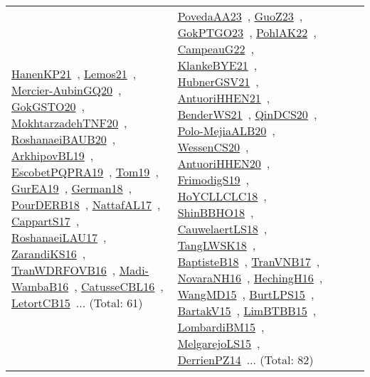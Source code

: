 {\begin{longtable}{lp{3cm}>{\raggedright\arraybackslash}p{6cm}>{\raggedright\arraybackslash}p{6cm}>{\raggedright\arraybackslash}p{8cm}}
\href{../works/HanenKP21.pdf}{HanenKP21}~\cite{HanenKP21}, \href{../works/Lemos21.pdf}{Lemos21}~\cite{Lemos21}, \href{../works/Mercier-AubinGQ20.pdf}{Mercier-AubinGQ20}~\cite{Mercier-AubinGQ20}, \href{../works/GokGSTO20.pdf}{GokGSTO20}~\cite{GokGSTO20}, \href{../works/MokhtarzadehTNF20.pdf}{MokhtarzadehTNF20}~\cite{MokhtarzadehTNF20}, \href{../works/RoshanaeiBAUB20.pdf}{RoshanaeiBAUB20}~\cite{RoshanaeiBAUB20}, \href{../works/ArkhipovBL19.pdf}{ArkhipovBL19}~\cite{ArkhipovBL19}, \href{../works/EscobetPQPRA19.pdf}{EscobetPQPRA19}~\cite{EscobetPQPRA19}, \href{../works/Tom19.pdf}{Tom19}~\cite{Tom19}, \href{../works/GurEA19.pdf}{GurEA19}~\cite{GurEA19}, \href{../works/German18.pdf}{German18}~\cite{German18}, \href{../works/PourDERB18.pdf}{PourDERB18}~\cite{PourDERB18}, \href{../works/NattafAL17.pdf}{NattafAL17}~\cite{NattafAL17}, \href{../works/CappartS17.pdf}{CappartS17}~\cite{CappartS17}, \href{../works/RoshanaeiLAU17.pdf}{RoshanaeiLAU17}~\cite{RoshanaeiLAU17}, \href{../works/ZarandiKS16.pdf}{ZarandiKS16}~\cite{ZarandiKS16}, \href{../works/TranWDRFOVB16.pdf}{TranWDRFOVB16}~\cite{TranWDRFOVB16}, \href{../works/Madi-WambaB16.pdf}{Madi-WambaB16}~\cite{Madi-WambaB16}, \href{../works/CatusseCBL16.pdf}{CatusseCBL16}~\cite{CatusseCBL16}, \href{../works/LetortCB15.pdf}{LetortCB15}~\cite{LetortCB15}... (Total: 61) & \href{../works/PovedaAA23.pdf}{PovedaAA23}~\cite{PovedaAA23}, \href{../works/GuoZ23.pdf}{GuoZ23}~\cite{GuoZ23}, \href{../works/GokPTGO23.pdf}{GokPTGO23}~\cite{GokPTGO23}, \href{../works/PohlAK22.pdf}{PohlAK22}~\cite{PohlAK22}, \href{../works/CampeauG22.pdf}{CampeauG22}~\cite{CampeauG22}, \href{../works/KlankeBYE21.pdf}{KlankeBYE21}~\cite{KlankeBYE21}, \href{../works/HubnerGSV21.pdf}{HubnerGSV21}~\cite{HubnerGSV21}, \href{../works/AntuoriHHEN21.pdf}{AntuoriHHEN21}~\cite{AntuoriHHEN21}, \href{../works/BenderWS21.pdf}{BenderWS21}~\cite{BenderWS21}, \href{../works/QinDCS20.pdf}{QinDCS20}~\cite{QinDCS20}, \href{../works/Polo-MejiaALB20.pdf}{Polo-MejiaALB20}~\cite{Polo-MejiaALB20}, \href{../works/WessenCS20.pdf}{WessenCS20}~\cite{WessenCS20}, \href{../works/AntuoriHHEN20.pdf}{AntuoriHHEN20}~\cite{AntuoriHHEN20}, \href{../works/FrimodigS19.pdf}{FrimodigS19}~\cite{FrimodigS19}, \href{../works/HoYCLLCLC18.pdf}{HoYCLLCLC18}~\cite{HoYCLLCLC18}, \href{../works/ShinBBHO18.pdf}{ShinBBHO18}~\cite{ShinBBHO18}, \href{../works/CauwelaertLS18.pdf}{CauwelaertLS18}~\cite{CauwelaertLS18}, \href{../works/TangLWSK18.pdf}{TangLWSK18}~\cite{TangLWSK18}, \href{../works/BaptisteB18.pdf}{BaptisteB18}~\cite{BaptisteB18}, \href{../works/TranVNB17.pdf}{TranVNB17}~\cite{TranVNB17}, \href{../works/NovaraNH16.pdf}{NovaraNH16}~\cite{NovaraNH16}, \href{../works/HechingH16.pdf}{HechingH16}~\cite{HechingH16}, \href{../works/WangMD15.pdf}{WangMD15}~\cite{WangMD15}, \href{../works/BurtLPS15.pdf}{BurtLPS15}~\cite{BurtLPS15}, \href{../works/BartakV15.pdf}{BartakV15}~\cite{BartakV15}, \href{../works/LimBTBB15.pdf}{LimBTBB15}~\cite{LimBTBB15}, \href{../works/LombardiBM15.pdf}{LombardiBM15}~\cite{LombardiBM15}, \href{../works/MelgarejoLS15.pdf}{MelgarejoLS15}~\cite{MelgarejoLS15}, \href{../works/DerrienPZ14.pdf}{DerrienPZ14}~\cite{DerrienPZ14}... (Total: 82)\\

\end{longtable}}
